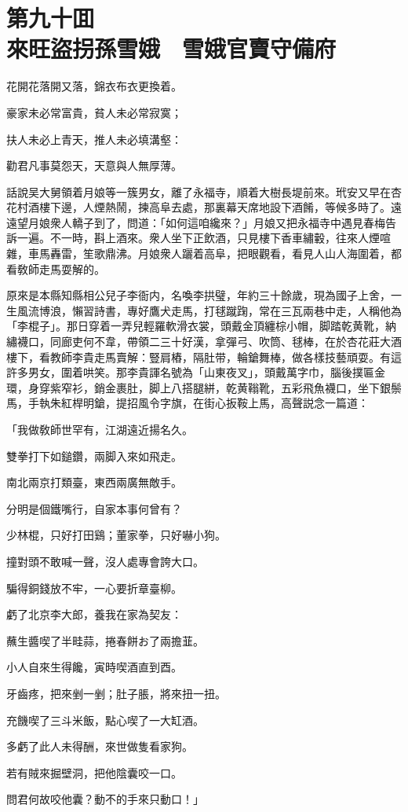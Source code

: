 
\chapter*{第九十囬　\\來旺盜拐孫雪娥　雪娥官賣守備府}


\begin{myquote}
花開花落開又落，錦衣布衣更換着。

豪家未必常富貴，貧人未必常寂寞；

扶人未必上青天，推人未必填溝壑：

勸君凡事莫怨天，天意與人無厚薄。
\end{myquote}

話說吴大舅領着月娘等一簇男女，離了永福寺，順着大樹長堤前來。玳安又早在杏花村酒樓下邊，人煙熱鬧，揀高阜去處，那裏幕天席地設下酒餚，等候多時了。遠遠望月娘衆人轎子到了，問道：「如何這咱纔來？」月娘又把永福寺中遇見春梅告訴一遍。不一時，斟上酒來。衆人坐下正飲酒，只見樓下香車繡轂，往來人煙喧雜，車馬轟雷，笙歌鼎沸。月娘衆人躧着高阜，把眼觀看，看見人山人海圍着，都看敎師走馬耍解的。

原來是本縣知縣相公兒子李衙内，名喚李拱璧，年約三十餘歲，現為國子上舍，一生風流博浪，懶習詩書，專好鷹犬走馬，打毬蹴踘，常在三瓦兩巷中走，人稱他為「李棍子」。那日穿着一弄兒輕羅軟滑衣裳，頭戴金頂纏棕小帽，脚踏乾黄靴，納繡襪口，同廊吏何不韋，帶領二三十好漢，拿彈弓、吹筒、毬棒，在於杏花莊大酒樓下，看教師李貴走馬賣解：豎肩樁，隔肚带，輪鎗舞棒，做各樣技藝頑耍。有這許多男女，圍着哄笑。那李貴諢名號為「山東夜叉」，頭戴萬字巾，腦後撲匾金環，身穿紫窄衫，銷金裹肚，脚上八搭腿絣，乾黄䩺靴，五彩飛魚襪口，坐下銀鬃馬，手執朱紅桿明鎗，提招風令字旗，在街心扳鞍上馬，高聲説念一篇道：

\begin{myquote}
「我做敎師世罕有，江湖遠近揚名久。

雙拳打下如鎚鑽，兩脚入來如飛走。

南北兩京打類臺，東西兩廣無敵手。

分明是個鐵嘴行，自家本事何曾有？

少林棍，只好打田鷄；董家拳，只好嚇小狗。

撞對頭不敢喊一聲，沒人處專會誇大口。

騙得銅錢放不牢，一心要折章臺柳。

虧了北京李大郎，養我在家為契友：

蘸生醬喫了半畦蒜，捲春餅お了兩擔韮。

小人自來生得饞，寅時喫酒直到酉。

牙齒疼，把來剉一剉；肚子脹，將來扭一扭。

充饑喫了三斗米飯，點心喫了一大缸酒。

多虧了此人未得酬，來世做隻看家狗。

若有賊來掘壁洞，把他陰囊咬一口。

問君何故咬他囊？動不的手來只動口！」
\end{myquote}

